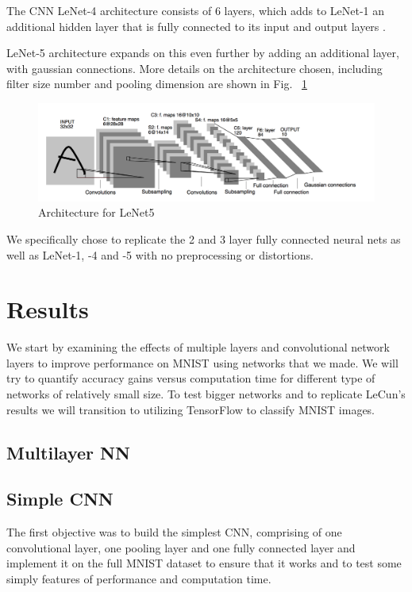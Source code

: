 \documentclass[12pt, twocolumn]{article}
\begin{document}
The CNN LeNet-4 architecture consists of 6 layers, which adds to LeNet-1 an additional hidden layer that is fully connected to its  input and output layers . \cite{LeCun95}

LeNet-5 architecture expands on this even further by adding an additional layer, with gaussian connections. More details on the architecture chosen, including filter size number and pooling dimension are shown in Fig. ~\ref{fig:LeNet5}

 \begin{figure}
\includegraphics[scale=.6]{LeNet5.png}
\caption{Architecture for LeNet5 \cite{LeCun1998}}
\label{fig:LeNet5}
\end{figure}


 We specifically chose to replicate the 2 and 3 layer fully connected neural nets as well as LeNet-1, -4 and -5 with no preprocessing or distortions. 


\section{Results}
We start by examining the effects of multiple layers and convolutional network layers to improve performance on MNIST using networks that we made. We will try to quantify accuracy gains versus computation time for different type of networks of relatively small size. To test bigger networks and to replicate LeCun's results we will transition to utilizing TensorFlow to classify MNIST images. 

\subsection{Multilayer NN}
\subsection{Simple CNN}
The first objective was to build the simplest CNN, comprising of one convolutional layer, one pooling layer and one fully connected layer and implement it on the full MNIST dataset to ensure that it works and to test some simply features of performance and computation time.  
\end{document}
